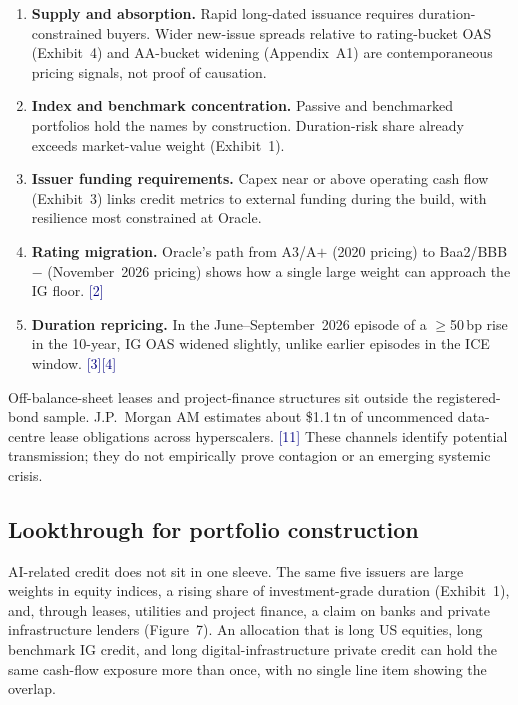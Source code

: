 \documentclass[10pt,letterpaper]{article}
\newcommand{\src}[1]{{\scriptsize\textcolor{navy}{[#1]}}}
\begin{document}
\vspace{0.2em}

\begin{enumerate}[leftmargin=1.2em,itemsep=0.22em]
  \item \textbf{Supply and absorption.} Rapid long-dated issuance requires duration-constrained buyers. Wider new-issue spreads relative to rating-bucket OAS (Exhibit~4) and AA-bucket widening (Appendix~A1) are contemporaneous pricing signals, not proof of causation.
  \item \textbf{Index and benchmark concentration.} Passive and benchmarked portfolios hold the names by construction. Duration-risk share already exceeds market-value weight (Exhibit~1).
  \item \textbf{Issuer funding requirements.} Capex near or above operating cash flow (Exhibit~3) links credit metrics to external funding during the build, with resilience most constrained at Oracle.
  \item \textbf{Rating migration.} Oracle's path from A3/A$+$ (2020 pricing) to Baa2/BBB$-$ (November~2026 pricing) shows how a single large weight can approach the IG floor. \src{2}
  \item \textbf{Duration repricing.} In the June--September~2026 episode of a $\ge$50\,bp rise in the 10-year, IG OAS widened slightly, unlike earlier episodes in the ICE window. \src{3}\src{4}
\end{enumerate}

Off-balance-sheet leases and project-finance structures sit outside the registered-bond sample. J.P.~Morgan AM estimates about \$1.1\,tn of uncommenced data-centre lease obligations across hyperscalers. \src{11} These channels identify potential transmission; they do not empirically prove contagion or an emerging systemic crisis.

\subsection{Lookthrough for portfolio construction}

AI-related credit does not sit in one sleeve. The same five issuers are large weights in equity indices, a rising share of investment-grade duration (Exhibit~1), and, through leases, utilities and project finance, a claim on banks and private infrastructure lenders (Figure~7). An allocation that is long US equities, long benchmark IG credit, and long digital-infrastructure private credit can hold the same cash-flow exposure more than once, with no single line item showing the overlap.
\end{document}
